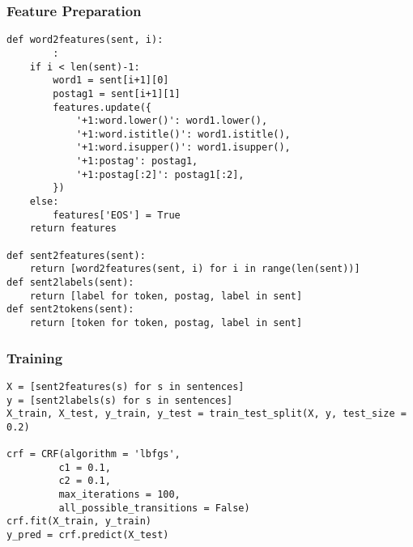 \begin{frame}[fragile]\frametitle{Feature Preparation}


\begin{lstlisting}
def word2features(sent, i):
		:
    if i < len(sent)-1:
        word1 = sent[i+1][0]
        postag1 = sent[i+1][1]
        features.update({
            '+1:word.lower()': word1.lower(),
            '+1:word.istitle()': word1.istitle(),
            '+1:word.isupper()': word1.isupper(),
            '+1:postag': postag1,
            '+1:postag[:2]': postag1[:2],
        })
    else:
        features['EOS'] = True
    return features
		
def sent2features(sent):
    return [word2features(sent, i) for i in range(len(sent))]
def sent2labels(sent):
    return [label for token, postag, label in sent]
def sent2tokens(sent):
    return [token for token, postag, label in sent]		
\end{lstlisting}
\end{frame}

\begin{frame}[fragile]\frametitle{Training}


\begin{lstlisting}
X = [sent2features(s) for s in sentences]
y = [sent2labels(s) for s in sentences]
X_train, X_test, y_train, y_test = train_test_split(X, y, test_size = 0.2)

crf = CRF(algorithm = 'lbfgs',
         c1 = 0.1,
         c2 = 0.1,
         max_iterations = 100,
         all_possible_transitions = False)
crf.fit(X_train, y_train)
y_pred = crf.predict(X_test)
\end{lstlisting}
\end{frame}

